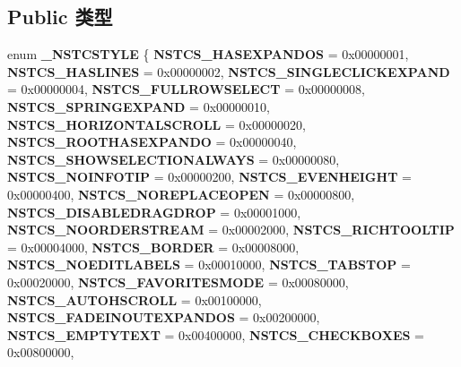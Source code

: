 \subsection*{Public 类型}
\begin{DoxyCompactItemize}
\item 
\mbox{\label{interface_i_name_space_tree_control_a9584d7fe47ae29cc088935856991819c}} 
enum {\bfseries \+\_\+\+N\+S\+T\+C\+S\+T\+Y\+LE} \{ \newline
{\bfseries N\+S\+T\+C\+S\+\_\+\+H\+A\+S\+E\+X\+P\+A\+N\+D\+OS} = 0x00000001, 
{\bfseries N\+S\+T\+C\+S\+\_\+\+H\+A\+S\+L\+I\+N\+ES} = 0x00000002, 
{\bfseries N\+S\+T\+C\+S\+\_\+\+S\+I\+N\+G\+L\+E\+C\+L\+I\+C\+K\+E\+X\+P\+A\+ND} = 0x00000004, 
{\bfseries N\+S\+T\+C\+S\+\_\+\+F\+U\+L\+L\+R\+O\+W\+S\+E\+L\+E\+CT} = 0x00000008, 
\newline
{\bfseries N\+S\+T\+C\+S\+\_\+\+S\+P\+R\+I\+N\+G\+E\+X\+P\+A\+ND} = 0x00000010, 
{\bfseries N\+S\+T\+C\+S\+\_\+\+H\+O\+R\+I\+Z\+O\+N\+T\+A\+L\+S\+C\+R\+O\+LL} = 0x00000020, 
{\bfseries N\+S\+T\+C\+S\+\_\+\+R\+O\+O\+T\+H\+A\+S\+E\+X\+P\+A\+N\+DO} = 0x00000040, 
{\bfseries N\+S\+T\+C\+S\+\_\+\+S\+H\+O\+W\+S\+E\+L\+E\+C\+T\+I\+O\+N\+A\+L\+W\+A\+YS} = 0x00000080, 
\newline
{\bfseries N\+S\+T\+C\+S\+\_\+\+N\+O\+I\+N\+F\+O\+T\+IP} = 0x00000200, 
{\bfseries N\+S\+T\+C\+S\+\_\+\+E\+V\+E\+N\+H\+E\+I\+G\+HT} = 0x00000400, 
{\bfseries N\+S\+T\+C\+S\+\_\+\+N\+O\+R\+E\+P\+L\+A\+C\+E\+O\+P\+EN} = 0x00000800, 
{\bfseries N\+S\+T\+C\+S\+\_\+\+D\+I\+S\+A\+B\+L\+E\+D\+R\+A\+G\+D\+R\+OP} = 0x00001000, 
\newline
{\bfseries N\+S\+T\+C\+S\+\_\+\+N\+O\+O\+R\+D\+E\+R\+S\+T\+R\+E\+AM} = 0x00002000, 
{\bfseries N\+S\+T\+C\+S\+\_\+\+R\+I\+C\+H\+T\+O\+O\+L\+T\+IP} = 0x00004000, 
{\bfseries N\+S\+T\+C\+S\+\_\+\+B\+O\+R\+D\+ER} = 0x00008000, 
{\bfseries N\+S\+T\+C\+S\+\_\+\+N\+O\+E\+D\+I\+T\+L\+A\+B\+E\+LS} = 0x00010000, 
\newline
{\bfseries N\+S\+T\+C\+S\+\_\+\+T\+A\+B\+S\+T\+OP} = 0x00020000, 
{\bfseries N\+S\+T\+C\+S\+\_\+\+F\+A\+V\+O\+R\+I\+T\+E\+S\+M\+O\+DE} = 0x00080000, 
{\bfseries N\+S\+T\+C\+S\+\_\+\+A\+U\+T\+O\+H\+S\+C\+R\+O\+LL} = 0x00100000, 
{\bfseries N\+S\+T\+C\+S\+\_\+\+F\+A\+D\+E\+I\+N\+O\+U\+T\+E\+X\+P\+A\+N\+D\+OS} = 0x00200000, 
\newline
{\bfseries N\+S\+T\+C\+S\+\_\+\+E\+M\+P\+T\+Y\+T\+E\+XT} = 0x00400000, 
{\bfseries N\+S\+T\+C\+S\+\_\+\+C\+H\+E\+C\+K\+B\+O\+X\+ES} = 0x00800000, 

\end{DoxyCompactItemize}
